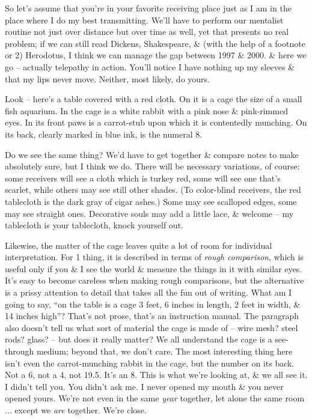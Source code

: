 \documentclass{article}
\numberwithin{equation}{section}
\begin{document}
So let's assume that you're in your favorite receiving place just as I am in the place where I do my best transmitting. We'll have to perform our mentalist routine not just over distance but over time as well, yet that presents no real problem; if we can still read Dickens, Shakespeare, \& (with the help of a footnote or 2) Herodotus, I think we can manage the gap between 1997 \& 2000. \& here we go -- actually telepathy in action. You'll notice I have nothing up my sleeves \& that my lips never move. Neither, most likely, do yours.

Look -- here's a table covered with a red cloth. On it is a cage the size of a small fish aquarium. In the cage is a white rabbit with a pink nose \& pink-rimmed eyes. In its front paws is a carrot-stub upon which it is contentedly munching. On its back, clearly marked in blue ink, is the numeral 8.

Do we see the same thing? We'd have to get together \& compare notes to make absolutely sure, but I think we do. There will be necessary variations, of course: some receivers will see a cloth which is turkey red, some will see one that's scarlet, while others may see still other shades. (To color-blind receivers, the red tablecloth is the dark gray of cigar ashes.) Some may see scalloped edges, some may see straight ones. Decorative souls may add a little lace, \& welcome -- my tablecloth is your tablecloth, knock yourself out.

Likewise, the matter of the cage leaves quite a lot of room for individual interpretation. For 1 thing, it is described in terms of \textit{rough comparison}, which is useful only if you \& I see the world \& measure the things in it with similar eyes. It's easy to become careless when making rough comparisons, but the alternative is a prissy attention to detail that takes all the fun out of writing. What am I going to say, ``on the table is a cage 3 feet, 6 inches in length, 2 feet in width, \& 14 inches high''? That's not prose, that's an instruction manual. The paragraph also doesn't tell us what sort of material the cage is made of -- wire mesh? steel rods? glass? -- but does it really matter? We all understand the cage is a see-through medium; beyond that, we don't care. The most interesting thing here isn't even the carrot-munching rabbit in the cage, but the number on its back. Not a 6, not a 4, not 19.5. It's an 8. This is what we're looking at, \& we all see it. I didn't tell you. You didn't ask me. I never opened my mouth \& you never opened yours. We're not even in the same \textit{year} together, let alone the same room $\ldots$ except we \textit{are} together. We're close.
\end{document}
